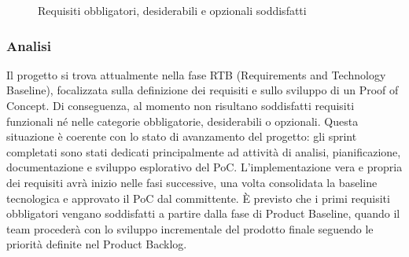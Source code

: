 \documentclass[a4paper,11pt,oneside]{scrartcl}
\begin{document}
\begin{figure}[H]
\centering


\caption{Requisiti obbligatori, desiderabili e opzionali soddisfatti}
\label{fig:requisiti_soddisfatti}
\end{figure}

\subsubsection*{Analisi}

Il progetto si trova attualmente nella fase RTB (Requirements and Technology Baseline), focalizzata sulla definizione dei requisiti e sullo sviluppo di un Proof of Concept. Di conseguenza, al momento non risultano soddisfatti requisiti funzionali né nelle categorie obbligatorie, desiderabili o opzionali. Questa situazione è coerente con lo stato di avanzamento del progetto: gli sprint completati sono stati dedicati principalmente ad attività di analisi, pianificazione, documentazione e sviluppo esplorativo del PoC. L'implementazione vera e propria dei requisiti avrà inizio nelle fasi successive, una volta consolidata la baseline tecnologica e approvato il PoC dal committente. È previsto che i primi requisiti obbligatori vengano soddisfatti a partire dalla fase di Product Baseline, quando il team procederà con lo sviluppo incrementale del prodotto finale seguendo le priorità definite nel Product Backlog{\scriptsize{}}.
\end{document}
